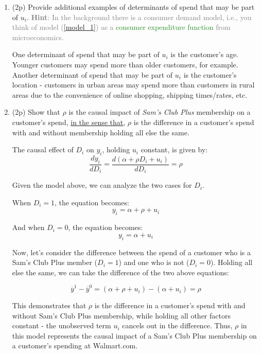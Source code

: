 \documentclass{article}
\newcommand{\gap}{\vspace{1 em}}
\begin{document}
\begin{enumerate}[label=\textbf{Q\arabic{enumi}}.,ref=Q\arabic{enumi}, wide=0pt, itemsep=1em, topsep=5pt]
    \begin{enumerate}
        \item (2p) Provide additional examples of determinants of spend that may be part of $u _{i}$. \textcolor{gray}{\textbf{Hint}: In the background there is a consumer demand model, i.e., you think of model (\ref{model_1}) as a \textcolor{ForestGreen}{consumer expenditure function} from microeconomics.}
        \begin{solution}
            {
                One determinant of spend that may be part of $u_i$ is the customer's age. Younger customers may spend more than older customers, for example. Another determinant of spend that may be part of $u_i$ is the customer's location - customers in urban areas may spend more than customers in rural areas due to the convenience of online shopping, shipping times/rates, etc.
            }
        \end{solution}
        \gap
        \item (2p) Show that $\rho$ is the causal impact of \textit{Sam's Club Plus} membership on a customer's spend, \newline\underline{in the sense that}, $\rho$ is the difference in a customer's spend with and without membership holding all else the same.
        
        \begin{solution}
        {
            The causal effect of $D_i$ on $y_i$, holding $u_i$ constant, is given by:
            \[ \frac{dy_{i}}{dD_{i}} = \frac{d(\alpha + \rho D_{i}+ u_{i})}{dD_{i}} = \rho \]

            Given the model above, we can analyze the two cases for $D_i$.

            When $D_{i} = 1$, the equation becomes:
            \[ y_{i} = \alpha + \rho + u_{i} \]

            And when $D_{i} = 0$, the equation becomes:
            \[ y_{i} = \alpha + u_{i} \]

            Now, let's consider the difference between the spend of a customer who is a Sam's Club Plus member ($D_{i} = 1$) and one who is not ($D_{i} = 0$). Holding all else the same, we can take the difference of the two above equations:

            \[ \overline{y}^{1} - \overline{y}^{0} = \left( \alpha + \rho + u_{i} \right) - \left( \alpha + u_{i} \right) = \rho \]

            This demonstrates that $\rho$ is the difference in a customer's spend with and without Sam's Club Plus membership, while holding all other factors constant - the unobserved term $u_{i}$ cancels out in the difference. Thus, $\rho$ in this model represents the causal impact of a Sam's Club Plus membership on a customer's spending at Walmart.com.
        
}
\end{solution}
\end{enumerate}
\end{enumerate}
\end{document}
